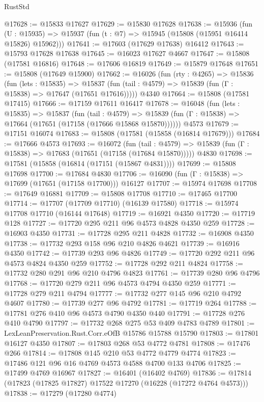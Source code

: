 \begin{lexlean}{RustStd}
\begin{coremodule}
@17628 := @15833 @17627
@17629 := @15830 @17628
@17638 := @15936
    (fun (U : @15935) => @15937 (fun (t : @7) => @15945 (@15808 (@15951 @16414 @15826) @15962)))
@17641 := @17603 (@17629 @17638) @16412
@17643 := @15793 @17628 @17638
@17645 := @16023 @17627 @4667
@17647 := @15808 (@17581 @16816)
@17648 := @17606 @16819
@17649 := @15879 @17648
@17651 := @15808 (@17649 @15900)
@17662 := @16026
    (fun (rty : @4265) =>
    @15836
      (fun (lets : @15835) =>
      @15837 (fun (tail : @4579) => @15839 (fun (Γ : @15838) => @17647 (@17651 @17616)))))
    @4340
@17664 := @15808 (@17581 @17415)
@17666 := @17159 @17611 @16417
@17678 := @16048
    (fun (lets : @15835) =>
    @15837
      (fun (tail : @4579) =>
      @15839 (fun (Γ : @15838) => @17664 (@17651 (@17158 (@17666 @15868 @15870))))))
    @4573
@17679 := @17151 @16074
@17683 := @15808 (@17581 (@15858 (@16814 @17679)))
@17684 := @17666 @4573
@17693 := @16072
    (fun (tail : @4579) => @15839 (fun (Γ : @15838) => @17683 (@17651 (@17158 (@17684 @15870)))))
    @4830
@17698 := @17581 (@15858 (@16814 (@17151 (@15867 @4831))))
@17699 := @15808 @17698
@17700 := @17684 @4830
@17706 := @16090 (fun (Γ : @15838) => @17699 (@17651 (@17158 @17700))) @16127
@17707 := @15974 @17698
@17708 := @17649 @16881
@17709 := @15808 @17708
@17710 := @17465 @17700
@17714 := @17707 (@17709 @17710) (@16139 @17580)
@17718 := @15974 @17708 @17710 (@16144 @17648)
@17719 := @16921 @4350
@17720 := @17719 @128
@17727 := @17720 @295 @211 @96 @4573 @4828 @4350 @259
@17728 := @16903 @4350
@17731 := @17728 @295 @211 @4828
@17732 := @16908 @4350
@17738 := @17732 @293 @158 @96 @210 @4826 @4621
@17739 := @16916 @4350
@17742 := @17739 @293 @96 @4826
@17749 := @17720 @292 @211 @96 @4573 @4824 @4350 @259
@17752 := @17728 @292 @211 @4824
@17758 := @17732 @280 @291 @96 @210 @4796 @4823
@17761 := @17739 @280 @96 @4796
@17768 := @17720 @279 @211 @96 @4573 @4794 @4350 @259
@17771 := @17728 @279 @211 @4794
@17777 := @17732 @277 @145 @96 @210 @4792 @4607
@17780 := @17739 @277 @96 @4792
@17781 := @17719 @264
@17788 := @17781 @276 @410 @96 @4573 @4790 @4350 @440
@17791 := @17728 @276 @410 @4790
@17797 := @17732 @268 @275 @53 @409 @4783 @4789
@17801 := LexLeanPreservation.Rust.Corr.eOfB @15786 @15788 @15790
@17803 := @17801 @16127 @4350
@17807 := @17803 @268 @53 @4772 @4781
@17808 := @17476 @266
@17814 := @17808 @145 @210 @53 @4772 @4779 @4774
@17823 := @17486 @121 @96 @16 @4769 @4573 @4588 @4700 @133 @4706
@17825 := @17499 @4769 @16967
@17827 := @16401 (@16402 @4769)
@17836 := @17814 (@17823 (@17825 @17827) @17522 @17270 (@16228 (@17272 @4764 @4573)))
@17838 := @17279 (@17280 @4774)

\end{coremodule}
\end{lexlean}
